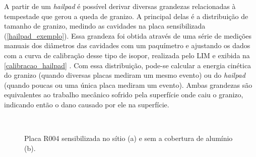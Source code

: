 A partir de um \textit{hailpad} é possível derivar diversas grandezas relacionadas à tempestade que gerou a queda de granizo. A principal delas é a distribuição de tamanho de granizo, medindo as cavidades na placa sensibilizada (\autoref{hailpad_exemplo}). Essa grandeza foi obtida através de uma série de medições manuais dos diâmetros das cavidades com um paquímetro e ajustando os dados com a curva de calibração desse tipo de isopor, realizada pelo LIM e exibida na \autoref{calibracao_hailpad} \cite{ThomazJunior2016}. Com essa distribuição, pode-se calcular a energia cinética do granizo (quando diversas placas mediram um mesmo evento) ou do \textit{hailpad} (quando poucas ou uma única placa mediram um evento). Ambas grandezas são equivalentes ao trabalho mecânico sofrido pela superfície onde caiu o granizo, indicando então o dano causado por ele na superfície.

\begin{figure}[htb]
	\begin{center}
		\caption{Placa R004 sensibilizada no sítio (a) e sem a cobertura de alumínio (b).} 
		\label{hailpad_exemplo}
		\quad
		\\
	\end{center}
\end{figure}

